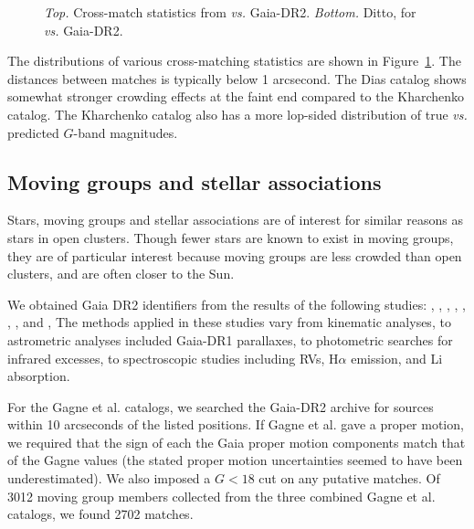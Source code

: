 \documentclass[12pt,twocolumn,tighten]{aastex62}
\begin{document}
\begin{figure}[!ht]
  \vspace{-0.8cm}
  \caption{
      {\it Top.} Cross-match statistics from \cite{Kharchenko_et_al_2013} {\it 
      vs.} Gaia-DR2.
      {\it Bottom.} Ditto, for \cite{dias_proper_2014} {\it vs.} Gaia-DR2.
  }
  \label{fig:xmatch_info}
\end{figure}

The distributions of various cross-matching statistics are shown in
Figure~\ref{fig:xmatch_info}.  The distances between matches is
typically below 1 arcsecond.  The Dias catalog shows somewhat stronger
crowding effects at the faint end compared to the Kharchenko catalog.
The Kharchenko catalog also has a more lop-sided distribution of true
{\it vs.} predicted $G$-band magnitudes.


\subsection{Moving groups and stellar associations}
\label{subsec:mg}

Stars, moving groups and stellar associations are of interest for
similar reasons as stars in open clusters.  Though fewer stars
are known to exist in moving groups, they are of particular interest
because moving groups are less crowded than open clusters, and are
often closer to the Sun.

We obtained Gaia DR2 identifiers from the results of the following
studies:
\citet{gagne_banyan_XI_2018},
\citet{gagne_banyan_XII_2018},
\citet{gagne_banyan_XIII_2018},
\citet{kraus_tucanahor_2014},
\citet{roser_deep_2011}, %
\citet{bell_32ori_2017},
\citet{rizzuto_multidimensional_2011},
and \citet{oh_comoving_2017}, The methods applied in these studies
vary from kinematic analyses, to astrometric analyses included
Gaia-DR1 parallaxes, to photometric searches for infrared excesses, to
spectroscopic studies including RVs, H$\alpha$
emission, and Li absorption.

For the Gagne et al{.} catalogs, we searched the Gaia-DR2 archive for
sources within 10 arcseconds of the listed positions.  If Gagne et
al{.} gave a proper motion, we required that the sign of each the Gaia
proper motion components match that of the Gagne values (the stated
proper motion uncertainties seemed to have been underestimated).  We
also imposed a $G<18$ cut on any putative matches.  Of 3012 moving
group members collected from the three combined Gagne et al{.}
catalogs, we found 2702 matches.
\end{document}
